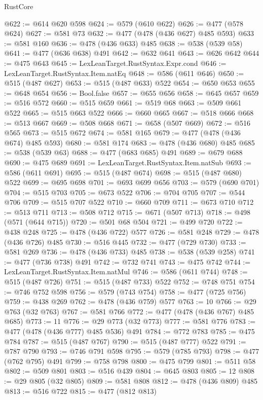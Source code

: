 \begin{lexlean}{RustCore}
\begin{coremodule}
@622 := @614 @620 @598
@624 := @579 (@610 @622)
@626 := @477 (@578 @624)
@627 := @581 @73
@632 := @477 (@478 (@436 @627) @485 @593)
@633 := @581 @160
@636 := @478 (@436 @633) @485
@638 := @538 (@539 @58)
@641 := @477 (@636 @638) @491
@642 := @632 @641
@643 := @626 @642
@644 := @475 @643
@645 := LexLeanTarget.RustSyntax.Expr.cond
@646 := LexLeanTarget.RustSyntax.Item.natEq
@648 := @586 (@611 @646)
@650 := @515 (@487 @627)
@653 := @515 (@487 @633) @522
@654 := @650 @653
@655 := @648 @654
@656 := Bool.false
@657 := @655 @656
@658 := @645 @657
@659 := @516 @572
@660 := @515 @659
@661 := @519 @68
@663 := @509 @661 @522
@665 := @515 @663 @522
@666 := @660 @665
@667 := @518 @666
@668 := @513 @667
@669 := @508 @668
@671 := @658 (@507 @669)
@672 := @516 @565
@673 := @515 @672
@674 := @581 @165
@679 := @477 (@478 (@436 @674) @485 @593)
@680 := @581 @174
@683 := @478 (@436 @680) @485
@685 := @538 (@539 @63)
@688 := @477 (@683 @685) @491
@689 := @679 @688
@690 := @475 @689
@691 := LexLeanTarget.RustSyntax.Item.natSub
@693 := @586 (@611 @691)
@695 := @515 (@487 @674)
@698 := @515 (@487 @680) @522
@699 := @695 @698
@701 := @693 @699 @656
@703 := @579 (@690 @701)
@704 := @515 @703
@705 := @673 @522
@706 := @704 @705
@707 := @544 @706
@709 := @515 @707 @522
@710 := @660 @709
@711 := @673 @710
@712 := @513 @711
@713 := @508 @712
@715 := @671 (@507 @713)
@718 := @498 (@571 (@644 @715))
@720 := @501 @68 @504
@721 := @499 @720
@722 := @438 @248
@725 := @478 (@436 @722) @577
@726 := @581 @248
@729 := @478 (@436 @726) @485
@730 := @516 @445
@732 := @477 (@729 @730)
@733 := @581 @269
@736 := @478 (@436 @733) @485
@738 := @538 (@539 @258)
@741 := @477 (@736 @738) @491
@742 := @732 @741
@743 := @475 @742
@744 := LexLeanTarget.RustSyntax.Item.natMul
@746 := @586 (@611 @744)
@748 := @515 (@487 @726)
@751 := @515 (@487 @733) @522
@752 := @748 @751
@754 := @746 @752 @598
@756 := @579 (@743 @754)
@758 := @477 (@725 @756)
@759 := @438 @269
@762 := @478 (@436 @759) @577
@763 := 10
@766 := @29 @763 (@32 @763)
@767 := @581 @766
@772 := @477 (@478 (@436 @767) @485 @685)
@773 := 11
@776 := @29 @773 (@32 @773)
@777 := @581 @776
@783 := @477 (@478 (@436 @777) @485 @536) @491
@784 := @772 @783
@785 := @475 @784
@787 := @515 (@487 @767)
@790 := @515 (@487 @777) @522
@791 := @787 @790
@793 := @746 @791 @598
@795 := @579 (@785 @793)
@798 := @477 (@762 @795) @491
@799 := @758 @798
@800 := @475 @799
@801 := @511 @58
@802 := @509 @801
@803 := @516 @439
@804 := @645 @803
@805 := 12
@808 := @29 @805 (@32 @805)
@809 := @581 @808
@812 := @478 (@436 @809) @485
@813 := @516 @722
@815 := @477 (@812 @813)

\end{coremodule}
\end{lexlean}
